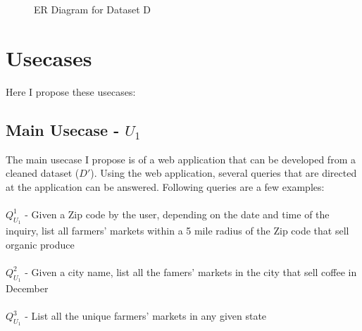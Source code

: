 \documentclass[10pt]{article}
\begin{document}
\begin{figure}
    
    \caption{ER Diagram for Dataset D} \label{fig:M1}
\end{figure}

\section{Usecases} \label{usec}
Here I propose these usecases:
\subsection{Main Usecase - $U_1$}
The main usecase I propose is of a web application that can be developed from a cleaned dataset ($D'$). Using the web application, several queries that are directed at the application can be answered. Following queries are a few examples:
\\ \\
$Q^{1}_{U_1}$ - Given a Zip code by the user, depending on the date and time of the inquiry, list all farmers' markets within a 5 mile radius of the Zip code that sell organic produce  \\ \\
$Q^{2}_{U_1}$ - Given a city name, list all the famers' markets in the city that sell coffee in December  \\ \\
$Q^{3}_{U_1}$ - List all the unique farmers' markets in any given state \\ \\
 
\end{document}
